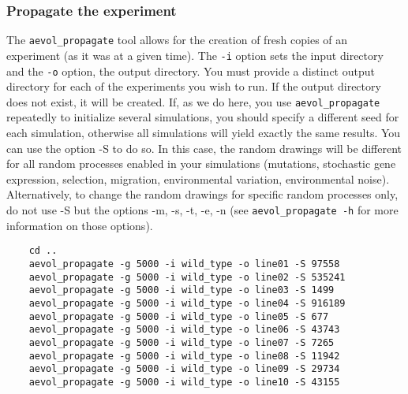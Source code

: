 
\subsubsection{Propagate the experiment}
The \verb?aevol_propagate? tool allows for the creation of fresh copies of an experiment (as it was at a given time). The \verb?-i? option sets the input directory and the \verb?-o? option, the output directory. You must provide a distinct output directory for each of the experiments you wish to run. If the output directory does not exist, it will be created.  If, as we do here, you use \verb?aevol_propagate? repeatedly to initialize several simulations, you should specify a different seed for each simulation, otherwise all simulations will yield exactly the same results. You can use the option -S to do so. In this case, the random drawings will be different for all random processes enabled in your simulations (mutations, stochastic gene expression, selection, migration, environmental variation, environmental noise). Alternatively, to change the random drawings for specific random processes only, do not use -S but the options -m, -s, -t, -e, -n (see \verb?aevol_propagate -h? for more information on those options).
\begin{verbatim}
	cd ..
	aevol_propagate -g 5000 -i wild_type -o line01 -S 97558
	aevol_propagate -g 5000 -i wild_type -o line02 -S 535241
	aevol_propagate -g 5000 -i wild_type -o line03 -S 1499
	aevol_propagate -g 5000 -i wild_type -o line04 -S 916189
	aevol_propagate -g 5000 -i wild_type -o line05 -S 677
	aevol_propagate -g 5000 -i wild_type -o line06 -S 43743
	aevol_propagate -g 5000 -i wild_type -o line07 -S 7265
	aevol_propagate -g 5000 -i wild_type -o line08 -S 11942
	aevol_propagate -g 5000 -i wild_type -o line09 -S 29734
	aevol_propagate -g 5000 -i wild_type -o line10 -S 43155
\end{verbatim}

